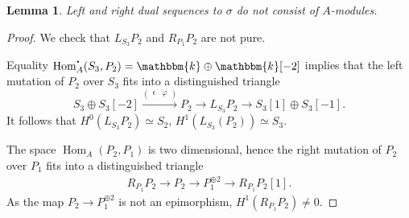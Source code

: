 \documentclass[12pt,a4paper]{amsart}
\newcommand{\f}{\varphi}
\newcommand{\kk}{\mathbbm{k}}
\newcommand{\bcdot}{{\mbox{\boldmath{$\cdot$}}}}
\newcommand{\Hom}{\mathop{\textrm{Hom}}\nolimits}
\newtheorem{LEM}{Lemma}[section]
\theoremstyle{definition}
\begin{document}
\begin{LEM}
	Left and right dual sequences to $\sigma$ do not consist of $A$-modules.
\end{LEM}
\begin{proof}
	We check that $L_{S_3}P_2$ and $R_{P_1}P_2$ are not pure.
	
	Equality $\Hom_A^\bcdot(S_3, P_2) =  \kk \oplus \kk[-2]$ implies that the left mutation of $P_2$ over $S_3$ fits into a distinguished triangle
	\begin{equation}\label{eqtn_L_S_3_P_2}
	S_3 \oplus S_3[-2] \xrightarrow{\left(\begin{array}{cc}\epsilon & \f 
		\end{array}\right)} P_2 \rightarrow L_{S_3}P_2\rightarrow S_3[1]\oplus S_3[-1].
	\end{equation}
	It follows that $H^0(L_{S_3}P_2)\simeq S_2$, $H^1(L_{S_3}(P_2)) \simeq S_3$.
	
	The space $\Hom_A(P_2, P_1)$ is two dimensional, hence the right mutation of $P_2$ over $P_1$ fits into a distinguished triangle
	\begin{align*}
	&R_{P_1}P_2 \to P_2 \to P_1^{\oplus 2} \to R_{P_1}P_2[1].&
	\end{align*}
	As the map $P_2 \to P_1^{\oplus 2} $ is not an epimorphism, $H^1(R_{P_1}P_2) \neq 0$.
\end{proof}
\end{document}
